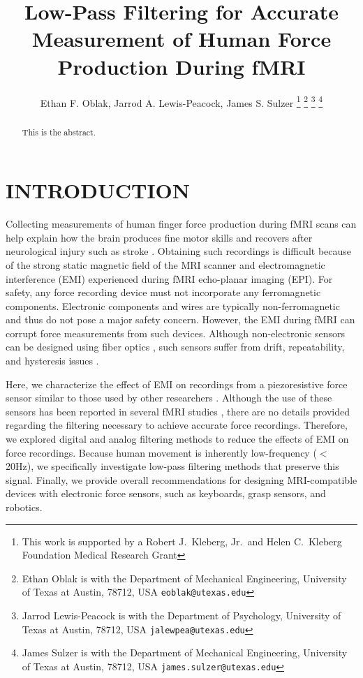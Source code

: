 \documentclass[letterpaper, 10 pt, conference]{ieeeconf}  %
\title{\LARGE \bf
Low-Pass Filtering for Accurate Measurement of Human Force Production During fMRI
}
\author{Ethan F. Oblak, Jarrod A. Lewis-Peacock, James S. Sulzer%
\thanks{This work is supported by a Robert J.\ Kleberg, Jr.\ and Helen C.\ Kleberg Foundation Medical Research Grant}%
\thanks{Ethan Oblak is with the Department of Mechanical Engineering, University of Texas at Austin, 78712, USA {\tt\small eoblak@utexas.edu}}%
\thanks{Jarrod Lewis-Peacock is with the Department of Psychology, University of Texas at Austin, 78712, USA {\tt\small jalewpea@utexas.edu}}%
\thanks{James Sulzer is with the Department of Mechanical Engineering, University of Texas at Austin, 78712, USA {\tt\small james.sulzer@utexas.edu}}%
}
\begin{document}
\maketitle
\thispagestyle{empty}
\pagestyle{empty}

\begin{abstract}

This is the abstract.

\end{abstract}


\section{INTRODUCTION}

Collecting measurements of human finger force production during fMRI scans can help explain how the brain produces fine motor skills \cite{wiestler2013skill, ejaz2015hand} and recovers after neurological injury such as stroke \cite{ejaz2018evidence}. Obtaining such recordings is difficult because of the strong static magnetic field of the MRI scanner and electromagnetic interference (EMI) experienced during fMRI echo-planar imaging (EPI). For safety, any force recording device must not incorporate any ferromagnetic components. Electronic components and wires are typically non-ferromagnetic and thus do not pose a major safety concern. However, the EMI during fMRI can corrupt force measurements from such devices. Although non-electronic sensors can be designed using fiber optics \cite{arata2013mri, butzer2015design}, such sensors suffer from drift, repeatability, and hysteresis issues \cite{han2017mri}.

Here, we characterize the effect of EMI on recordings from a piezoresistive force sensor similar to those used by other researchers \cite{diedrichsen2012two}. Although the use of these sensors has been reported in several fMRI studies \cite{diedrichsen2012two, wiestler2013skill, ejaz2015hand, ejaz2018evidence}, there are no details provided regarding the filtering necessary to achieve accurate force recordings. Therefore, we explored digital and analog filtering methods to reduce the effects of EMI on force recordings. Because human movement is inherently low-frequency ($<$20Hz), we specifically investigate low-pass filtering methods that preserve this signal. Finally, we provide overall recommendations for designing MRI-compatible devices with electronic force sensors, such as keyboards, grasp sensors, and robotics.
\end{document}

